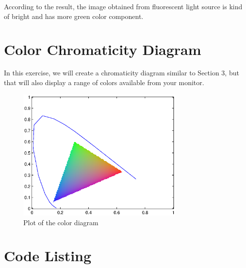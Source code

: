 \documentclass[paper=a4, fontsize=11pt]{scrartcl} %
\numberwithin{equation}{section} %
\numberwithin{figure}{section} %
\numberwithin{table}{section} %
\begin{document}
According to the result, the image obtained from fluorescent light source is kind of bright and has more green color component. 

\section{Color Chromaticity Diagram}
In this exercise, we will create a chromaticity diagram similar to Section 3, but that will
also display a range of colors available from your monitor.

\begin{figure}[H]
	
	\centering
	\includegraphics[height = 2.6in]{6.eps}
	\caption{Plot of the color diagram}
	
\end{figure}
\section{Code Listing}
\end{document}
